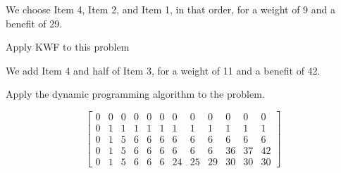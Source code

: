 \documentclass[12pt,letterpaper,twoside]{hmcpset}
\begin{document}
\begin{solution}
 We choose Item 4, Item 2, and Item 1, in that order, for a weight of 9 and a benefit of 29.
\end{solution}

\begin{problem}[6b]
 Apply KWF to this problem
\end{problem}

\begin{solution}
 We add Item 4 and half of Item 3, for a weight of 11 and a benefit of 42.
\end{solution}

\begin{problem}[6c]
 Apply the dynamic programming algorithm to the problem.
\end{problem}

\begin{solution}
\setcounter{MaxMatrixCols}{20}
 \[
\begin{bmatrix}
0 & 0 & 0 & 0 & 0 & 0 & 0 & 0 & 0 & 0 & 0 & 0\\
0 & 1 & 1 & 1 & 1 & 1 & 1 & 1 & 1 & 1 & 1 & 1\\
0 & 1 & 5 & 6 & 6 & 6 & 6 & 6 & 6 & 6 & 6 & 6\\
0 & 1 & 5 & 6 & 6 & 6 & 6 & 6 & 6 & 36 & 37 & 42\\
0 & 1 & 5 & 6 & 6 & 6 & 24 & 25 & 29 & 30 & 30 & 30
\end{bmatrix}
 \]

\end{solution}
\end{document}
